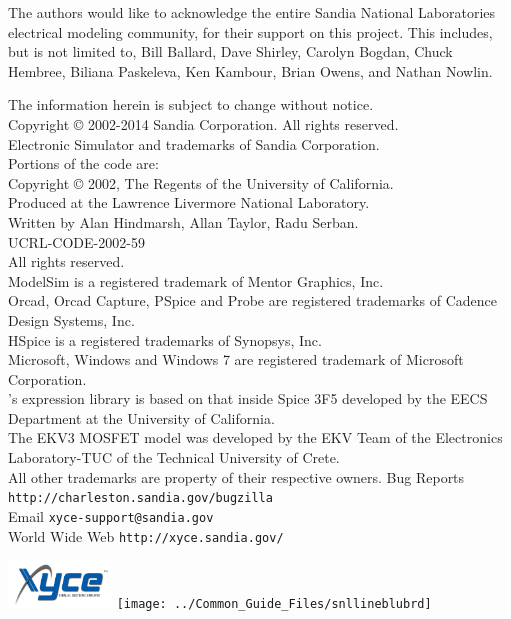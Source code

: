 


The authors would like to acknowledge the entire Sandia National
Laboratories electrical modeling community, for their support 
on this project.  This includes, but is not limited to, Bill Ballard,
Dave Shirley, Carolyn Bogdan, Chuck Hembree, 
Biliana Paskeleva, Ken Kambour, Brian Owens, and Nathan Nowlin.

The information herein is subject to change without notice.\\[0.5em]
Copyright \copyright{} 2002-2014 Sandia Corporation.  All rights
reserved.\\
\XyceTM{} Electronic Simulator and \XyceTM{} trademarks of Sandia
Corporation.\\
Portions of the \XyceTM{} code are:  \\
Copyright \copyright{} 2002, The Regents of the University of California. \\
Produced at the Lawrence Livermore National Laboratory. \\
Written by Alan Hindmarsh, Allan Taylor, Radu Serban. \\
UCRL-CODE-2002-59 \\
All rights reserved. \\[0.5em]
ModelSim is a registered trademark of Mentor Graphics, Inc.\\[0.5em]
Orcad, Orcad Capture, PSpice and Probe are registered trademarks of Cadence Design Systems, Inc.\\[0.5em]
HSpice is a registered trademarks of Synopsys, Inc.\\[0.5em]
Microsoft, Windows and Windows 7 are registered trademark of Microsoft
Corporation.\\[0.5em]
\Xyce{}'s expression library is based on that inside Spice 3F5 developed by
the EECS Department at the University of California. \\[0.5em]
The EKV3 MOSFET model was developed by the EKV Team of the Electronics Laboratory-TUC of the Technical University of Crete. \\[0.5em]
All other trademarks are property of their respective owners.
 \label{Contacts}
Bug Reports \hfill \texttt{\color{XyceDeepRed}http://charleston.sandia.gov/bugzilla} \\
Email \hfill \texttt{\color{XyceDeepRed}xyce-support@sandia.gov} \\
World Wide Web \hfill \texttt{\color{XyceDeepRed}http://xyce.sandia.gov/}

\vspace*{\fill}
\includegraphics[height=0.5in]{../Common_Guide_Files/xyce_flat_white}
\hfill
\texttt{[image: ../Common\_Guide\_Files/snllineblubrd]}

